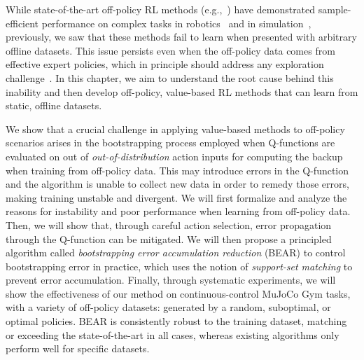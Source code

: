 While state-of-the-art off-policy RL methods   (e.g.,~\citep{haarnoja2018sac,munos2016safe,kalashnikov18qtopt,impala2018}) have demonstrated sample-efficient performance on complex tasks in robotics~\cite{kalashnikov18qtopt} and in simulation~\cite{mujoco}, previously, we saw that these methods fail to learn when presented with arbitrary offline datasets. This issue persists even when the off-policy data comes from effective expert policies, which in principle should address any exploration challenge~\citep{deBruin2015importance,fujimoto2018off,fu2019diagnosing}. In this chapter, we aim to understand the root cause behind this inability and then develop off-policy, value-based RL methods that can learn from static, offline datasets. 

We show that a crucial challenge in applying value-based methods to off-policy scenarios arises in the bootstrapping process employed
when Q-functions are evaluated on out of \textit{out-of-distribution} action inputs for computing the backup when training from off-policy data. This may introduce errors in the Q-function and the algorithm is unable to collect new data in order to remedy those errors, making training unstable and divergent. We will first formalize and analyze the reasons for instability and poor performance when learning from off-policy data. Then, we will show that, through careful action selection, error propagation through the Q-function can be mitigated. We will then propose a principled algorithm called \emph{bootstrapping error accumulation reduction} (BEAR) to control bootstrapping error in practice, which uses the notion of \emph{support-set matching} to prevent error accumulation. Finally, through systematic experiments, we will show the effectiveness of our method on continuous-control MuJoCo Gym tasks, with a variety of off-policy datasets: generated by a random, suboptimal, or optimal policies. BEAR is consistently robust to the training dataset, matching or exceeding the state-of-the-art in all cases, whereas existing algorithms only perform well for specific datasets.


